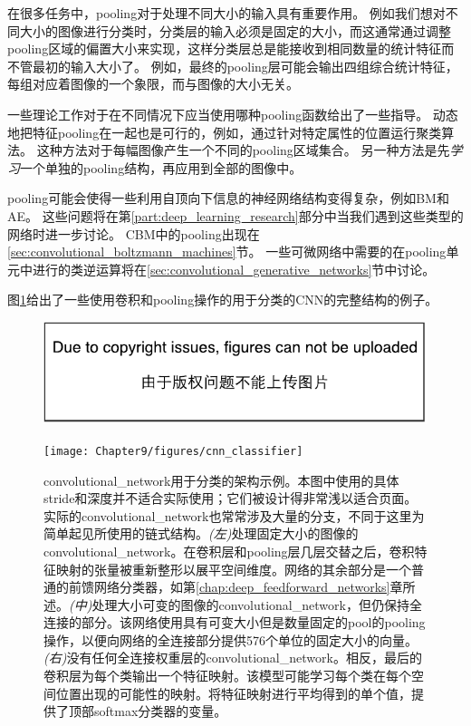  
在很多任务中，\gls{pooling}对于处理不同大小的输入具有重要作用。
例如我们想对不同大小的图像进行分类时，分类层的输入必须是固定的大小，而这通常通过调整\gls{pooling}区域的偏置大小来实现，这样分类层总是能接收到相同数量的统计特征而不管最初的输入大小了。
例如，最终的\gls{pooling}层可能会输出四组综合统计特征，每组对应着图像的一个象限，而与图像的大小无关。

一些理论工作对于在不同情况下应当使用哪种\gls{pooling}函数给出了一些指导\citep{boureau-icml-10}。
动态地把特征\gls{pooling}在一起也是可行的，例如，通过针对特定属性的位置运行聚类算法\citep{boureau-iccv-11}。
这种方法对于每幅图像产生一个不同的\gls{pooling}区域集合。
另一种方法是先\emph{学习}一个单独的\gls{pooling}结构，再应用到全部的图像中\citep{jia2012beyond}。

\gls{pooling}可能会使得一些利用自顶向下信息的神经网络结构变得复杂，例如\gls{BM}和\gls{AE}。
这些问题将在第\ref{part:deep_learning_research}部分中当我们遇到这些类型的网络时进一步讨论。
\gls{CBM}中的\gls{pooling}出现在\ref{sec:convolutional_boltzmann_machines}节。
一些可微网络中需要的在\gls{pooling}单元中进行的类逆运算将在\ref{sec:convolutional_generative_networks}节中讨论。

图\ref{fig:chap9_cnn_classifier}给出了一些使用卷积和\gls{pooling}操作的用于分类的\gls{CNN}的完整结构的例子。
\begin{figure}[!htb]
\ifOpenSource
\centerline{\includegraphics{figure.pdf}}
\else
\centerline{\texttt{[image: Chapter9/figures/cnn\_classifier]}}
\fi
\caption{\gls{convolutional_network}用于分类的架构示例。本图中使用的具体\gls{stride}和深度并不适合实际使用；它们被设计得非常浅以适合页面。实际的\gls{convolutional_network}也常常涉及大量的分支，不同于这里为简单起见所使用的链式结构。\emph{(左)}处理固定大小的图像的\gls{convolutional_network}。在卷积层和\gls{pooling}层几层交替之后，卷积特征映射的张量被重新整形以展平空间维度。网络的其余部分是一个普通的前馈网络分类器，如第\ref{chap:deep_feedforward_networks}章所述。\emph{(中)}处理大小可变的图像的\gls{convolutional_network}，但仍保持全连接的部分。该网络使用具有可变大小但是数量固定的\gls{pool}的\gls{pooling}操作，以便向网络的全连接部分提供576个单位的固定大小的向量。 \emph{(右)}没有任何全连接权重层的\gls{convolutional_network}。相反，最后的卷积层为每个类输出一个特征映射。该模型可能学习每个类在每个空间位置出现的可能性的映射。将特征映射进行平均得到的单个值，提供了顶部softmax分类器的变量。}
\label{fig:chap9_cnn_classifier}
\end{figure}


